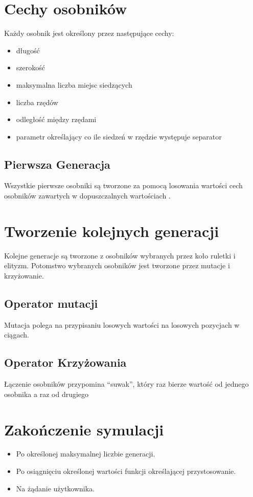 \documentclass[bibtotocnumbered, headsepline,normalheadings,12pt,polish]{scrreprt}
\begin{document}
\section{Cechy osobników}
Każdy osobnik jest określony przez następujące cechy:
\begin{itemize}
    \item długość
    \item szerokość
    \item maksymalna liczba miejsc siedzących
    \item liczba rzędów
    \item odległość między rzędami
    \item parametr określający co ile siedzeń w rzędzie występuje separator
\end{itemize}

\subsection{Pierwsza Generacja}
Wszystkie pierwsze osobniki są tworzone za pomocą losowania wartości cech osobników zawartych w dopuszczalnych wartościach .
\section{Tworzenie kolejnych generacji}
Kolejne generacje są tworzone z osobników wybranych przez koło ruletki i elityzm. Potomstwo wybranych osobników jest tworzone przez mutacje i krzyżowanie.
\subsection{Operator mutacji}
Mutacja polega na przypisaniu losowych wartości na losowych pozycjach w ciągach.
\subsection{Operator Krzyżowania}
Łączenie osobników przypomina ``suwak'', który raz bierze wartość od jednego osobnika a raz od drugiego

\section{Zakończenie symulacji}
\begin{itemize}
    \item Po określonej maksymalnej liczbie generacji.
    \item Po osiągnięciu określonej wartości funkcji określającej przystosowanie.
    \item Na żądanie użytkownika.
\end{itemize}
\end{document}
